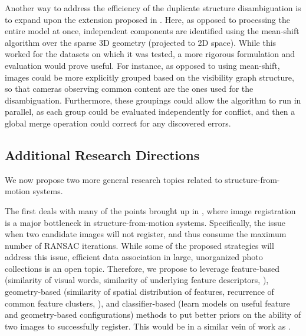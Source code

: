 Another way to address the efficiency of the duplicate structure disambiguation is to expand upon the extension proposed in .
Here, as opposed to processing the entire model at once, independent components are identified using the mean-shift algorithm over the sparse 3D geometry (projected to 2D space).
While this worked for the datasets on which it was tested, a more rigorous formulation and evaluation would prove useful.
For instance, as opposed to using mean-shift, images could be more explicitly grouped based on the visibility graph structure, so that cameras observing common content are the ones used for the disambiguation.
Furthermore, these groupings could allow the algorithm to run in parallel, as each group could be evaluated independently for conflict, and then a global merge operation could correct for any discovered errors.

\subsection{Additional Research Directions}

We now propose two more general research topics related to structure-from-motion systems.

The first deals with many of the points brought up in , where image registration is a major bottleneck in structure-from-motion systems.
Specifically, the issue when two candidate images will not register, and thus consume the maximum number of RANSAC iterations.
While some of the proposed strategies will address this issue, efficient data association in large, unorganized photo collections is an open topic.
Therefore, we propose to leverage feature-based (similarity of visual words, similarity of underlying feature descriptors, \etc), geometry-based (similarity of spatial distribution of features, recurrence of common feature clusters, \etc), and classifier-based (learn models on useful feature and geometry-based configurations) methods to put better priors on the ability of two images to successfully register.
This would be in a similar vein of work as \citet{li2009_scale_feature_matching, lou2012_match_miner, mills2013_improved_feature_matching, hartmann2014_predicting_matchability, schoenberger2015_paige}.

